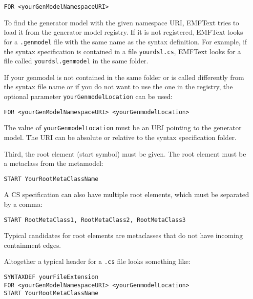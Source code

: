 \lstset{language=CS}
\begin{lstlisting}
FOR <yourGenModelNamespaceURI>
\end{lstlisting}

To find the generator model with the given namespace URI, EMFText tries to 
load it from the generator model registry. If it is not registered, EMFText 
looks for a \texttt{.genmodel} file with the same name as the syntax 
definition. For example, if the syntax 
specification is contained in a file \texttt{yourdsl.cs}, EMFText looks for a
file called \texttt{yourdsl.genmodel} in the same folder.

If your genmodel is not contained in the same folder or is called differently
from the syntax file name or if you do not want to use the one in the registry, 
the optional parameter \texttt{yourGenmodelLocation} can be used: 

\lstset{language=CS}
\begin{lstlisting}
FOR <yourGenModelNamespaceURI> <yourGenmodelLocation>
\end{lstlisting}

The value of \texttt{yourGenmodelLocation} must be an URI pointing to the 
generator model. The URI can be absolute or relative to the syntax 
specification folder.
 
Third, the root element (start symbol) must be given. The root element must be
a metaclass from the metamodel:

\lstset{language=CS}
\begin{lstlisting}
START YourRootMetaClassName
\end{lstlisting}

A CS specification can also have multiple root elements, which must be separated
by a comma:

\lstset{language=CS}
\begin{lstlisting}
START RootMetaClass1, RootMetaClass2, RootMetaClass3
\end{lstlisting}

Typical candidates for root elements are metaclasses that do not have incoming 
containment edges. 

Altogether a typical header for a \texttt{.cs} file looks something like:

\lstset{language=CS}
\begin{lstlisting}
SYNTAXDEF yourFileExtension
FOR <yourGenModelNamespaceURI> <yourGenmodelLocation>
START YourRootMetaClassName
\end{lstlisting} 

